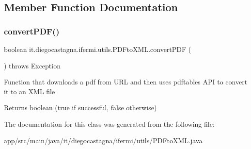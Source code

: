 \subsection{Member Function Documentation}
\mbox{\label{classit_1_1diegocastagna_1_1ifermi_1_1utils_1_1_p_d_fto_x_m_l_a9fe676675c1f47410dea3f0a12522cf2}} 
\subsubsection{\texorpdfstring{convertPDF()}{convertPDF()}}
{\footnotesize\ttfamily boolean it.\+diegocastagna.\+ifermi.\+utils.\+P\+D\+Fto\+X\+M\+L.\+convert\+P\+DF (\begin{DoxyParamCaption}{ }\end{DoxyParamCaption}) throws Exception\hspace{0.3cm}{\ttfamily [inline]}}

Function that downloads a pdf from U\+RL and then uses pdftables\textquotesingle{} A\+PI to convert it to an X\+ML file \begin{DoxyReturn}{Returns}
boolean (true if successful, false otherwise) 
\end{DoxyReturn}


The documentation for this class was generated from the following file\+:\begin{DoxyCompactItemize}
\item 
app/src/main/java/it/diegocastagna/ifermi/utils/P\+D\+Fto\+X\+M\+L.\+java\end{DoxyCompactItemize}
